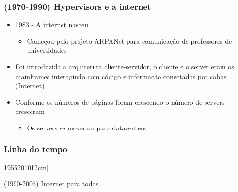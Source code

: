 \begin{frame}
	\frametitle{(1970-1990) Hypervisors e a internet}
	\begin{itemize}
		\item 1983 - A internet nasceu
			\begin{itemize}
				\item Começou pelo projeto ARPANet para comunicação de professores de universidades
			\end{itemize}
		\item Foi introduzida a arquitetura cliente-servidor, o cliente e o server eram os mainframes interagindo com código e informação conectados por cabos (Internet)
		\item Conforme os números de páginas foram crescendo o número de servers cresceram
			\begin{itemize}
				\item Os servers se moveram para datacenters
			\end{itemize}
	\end{itemize}
\end{frame}

\begin{frame}
	\frametitle{Linha do tempo}
	\begin{scriptsize}
	\begin{bf}
	\begin{center}
		\begin{chronology}[10]{1955}{2010}{12cm}[\textwidth]
			\color{lightgreen}
		\end{chronology}
	\end{center}
	\end{bf}
	\end{scriptsize}
	\begin{center}
		(1990-2006) Internet para todos
	\end{center}
\end{frame}

